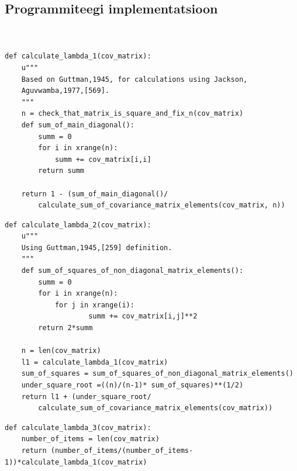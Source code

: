 \documentclass[a4paper,12pt,oneside]{article}
\newenvironment{customFloatWrap}{}{}
\numberwithin{equation}{section}
\theoremstyle{definition}
\begin{document}
\begin{subappendices}
\subsection{Programmiteegi implementatsioon}
\label{appendix:code}


\begin{customFloatWrap}
\begin{verbatim}


def calculate_lambda_1(cov_matrix):
    u""" 
    Based on Guttman,1945, for calculations using Jackson,
    Aguvwamba,1977,[569].
    """
    n = check_that_matrix_is_square_and_fix_n(cov_matrix)
    def sum_of_main_diagonal():
        summ = 0
        for i in xrange(n):
            summ += cov_matrix[i,i]
        return summ

    return 1 - (sum_of_main_diagonal()/
    	calculate_sum_of_covariance_matrix_elements(cov_matrix, n))

\end{verbatim}
\end{customFloatWrap}

\vspace{10pt}


\begin{customFloatWrap}
\begin{verbatim}
def calculate_lambda_2(cov_matrix):
    u"""
    Using Guttman,1945,[259] definition.
    """
    def sum_of_squares_of_non_diagonal_matrix_elements():
        summ = 0
        for i in xrange(n):
            for j in xrange(i):
                    summ += cov_matrix[i,j]**2 
        return 2*summ
    
    n = len(cov_matrix)
    l1 = calculate_lambda_1(cov_matrix)
    sum_of_squares = sum_of_squares_of_non_diagonal_matrix_elements()
    under_square_root =((n)/(n-1)* sum_of_squares)**(1/2)
    return l1 + (under_square_root/
        calculate_sum_of_covariance_matrix_elements(cov_matrix))
\end{verbatim}
\end{customFloatWrap}


\vspace{10pt}

\begin{customFloatWrap}
\begin{verbatim}
def calculate_lambda_3(cov_matrix):
    number_of_items = len(cov_matrix)
    return (number_of_items/(number_of_items-1))*calculate_lambda_1(cov_matrix)      
  

\end{verbatim}
\end{customFloatWrap}
\end{subappendices}
\end{document}

